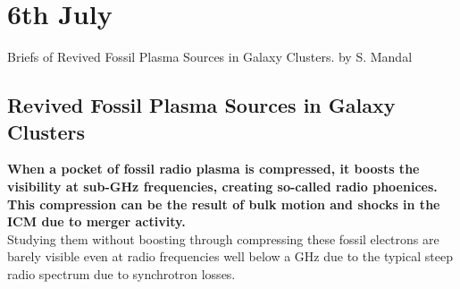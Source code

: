 \documentclass[11pt]{report}
\newcommand{\tbf}[1]{\textbf{#1}}
\begin{document}
\section{6th July}
Briefs of Revived Fossil Plasma Sources in Galaxy Clusters. by S. Mandal
\subsection{Revived Fossil Plasma Sources in Galaxy Clusters}
\tbf{When a pocket of fossil radio plasma is compressed, it boosts the visibility at sub-GHz frequencies, creating so-called radio phoenices. This compression can be the result of bulk motion and shocks in the ICM due to merger activity.}\\
Studying them without boosting through compressing  these fossil electrons are barely visible even at radio frequencies well below a GHz due to  the typical steep radio spectrum due to synchrotron losses.\\
\end{document}
